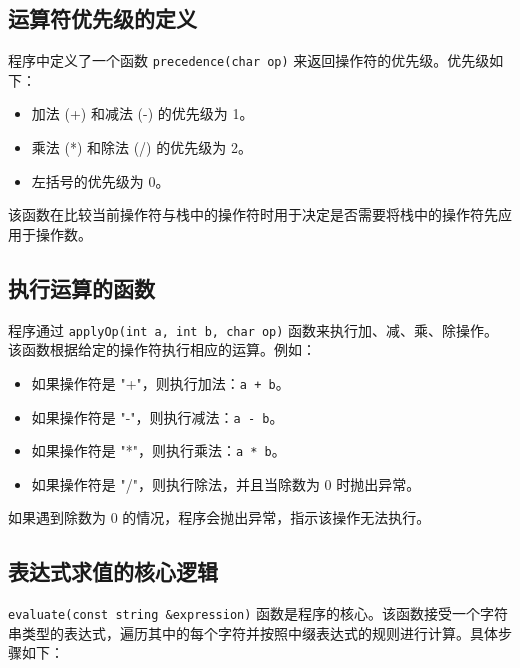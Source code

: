 \documentclass[UTF8]{ctexart}
\begin{document}
\subsection{运算符优先级的定义}

程序中定义了一个函数 \texttt{precedence(char op)} 来返回操作符的优先级。优先级如下：
\begin{itemize}
    \item 加法 (+) 和减法 (-) 的优先级为 1。
    \item 乘法 (*) 和除法 (/) 的优先级为 2。
    \item 左括号的优先级为 0。
\end{itemize}
该函数在比较当前操作符与栈中的操作符时用于决定是否需要将栈中的操作符先应用于操作数。

\subsection{执行运算的函数}

程序通过 \texttt{applyOp(int a, int b, char op)} 函数来执行加、减、乘、除操作。该函数根据给定的操作符执行相应的运算。例如：
\begin{itemize}
    \item 如果操作符是 "+"，则执行加法：\texttt{a + b}。
    \item 如果操作符是 "-"，则执行减法：\texttt{a - b}。
    \item 如果操作符是 "*"，则执行乘法：\texttt{a * b}。
    \item 如果操作符是 "/"，则执行除法，并且当除数为 0 时抛出异常。
\end{itemize}
如果遇到除数为 0 的情况，程序会抛出异常，指示该操作无法执行。

\subsection{表达式求值的核心逻辑}

\texttt{evaluate(const string \&expression)} 函数是程序的核心。该函数接受一个字符串类型的表达式，遍历其中的每个字符并按照中缀表达式的规则进行计算。具体步骤如下：
\end{document}
